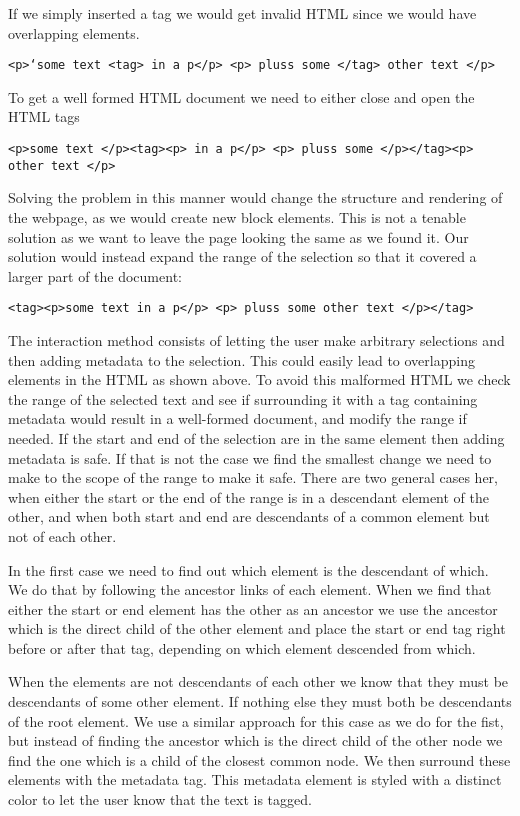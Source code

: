 If we simply inserted a tag we would get invalid HTML since we would have overlapping elements.

\texttt{<p>`some text <tag> in a p</p> <p> pluss some </tag>  other text </p>}

To get a well formed HTML document we need to either close and open the HTML tags

\texttt{<p>some text </p><tag><p> in a p</p> <p> pluss some </p></tag><p>  other text </p>}

Solving the problem in this manner would change the structure and rendering of the webpage,
as we would create new block elements.
This is not a tenable solution as we want to leave the page looking the same as we found it.
Our solution would instead expand the range of the selection so that it covered a larger part of the document:

\texttt{<tag><p>some text in a p</p> <p> pluss some other text </p></tag>}



The interaction method consists of letting the user make arbitrary selections and then adding metadata to the selection.
This could easily lead to overlapping elements in the HTML as shown above.
To avoid this malformed HTML we check the range of the selected text and see if surrounding it with a tag
containing metadata would result in a well-formed document, and modify the range if needed.
If the start and end of the selection are in the same element then adding metadata is safe.
If that is not the case we find the smallest change we need to make to the scope of the range to make it safe.
There are two general cases her, when either the start or the end of the range is in a descendant element of the other,
and when both start and end are descendants of a common element but not of each other.

In the first case we need to find out which element is the descendant of which.
We do that by following the ancestor links of each element.
When we find that either the start or end element has the other as an ancestor we use the ancestor which is the direct
child of the other element and place the start or end tag right before or after that tag, depending on which element
descended from which.

When the elements are not descendants of each other we know that they must be descendants of some other element.
If nothing else they must both be descendants of the root element.
We use a similar approach for this case as we do for the fist,
but instead of finding the ancestor which is the direct child of the other node we find the one which is a child of the
closest common node.
We then surround these elements with the metadata tag.
This metadata element is styled with a distinct color to let the user know that the text is tagged.

